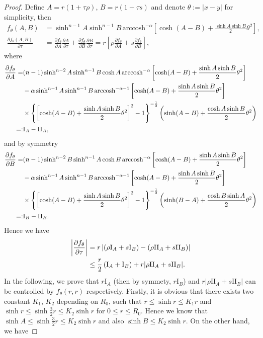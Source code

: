 \documentclass[11pt,reqno]{amsart}
\theoremstyle{definition}
\theoremstyle{remark}
\numberwithin{equation}{section}
\renewcommand{\(}{\left(}
\renewcommand{\)}{\right)}
\renewcommand{\-}{\overline}
\begin{document}
\begin{proof}
	Define $A=r(1+\tau\rho)$, $B=r(1+\tau s)$ and denote $\theta:=|x-y|$ for simplicity, then
	\begin{align}
		f_{\theta}(A,B)&=\sinh^{n-1}A\sinh^{n-1}B\,\text{arccosh}^{-\alpha}\left[\cosh(A-B)+\frac{\sinh A\sinh B}{2}\theta^2\right],\\
		\frac{\partial f_{\theta}(A,B)}{\partial\tau}&=\frac{\partial f_\theta}{\partial A}\frac{\partial A}{\partial\tau}+\frac{\partial f_\theta}{\partial B}\frac{\partial B}{\partial\tau}=r\left[\rho\frac{\partial f_\theta}{\partial A}+s\frac{\partial f_\theta}{\partial B}\right],
	\end{align}
	where 
	\begin{align}
		\frac{\partial f_{\theta}}{\partial A}=&(n-1)\sinh^{n-2}A\sinh^{n-1}B\cosh A\,\text{arccosh}^{-\alpha}\left[\cosh(A-B)+\frac{\sinh A\sinh B}{2}\theta^2\right]\notag\\
		&-\alpha\sinh^{n-1}A\sinh^{n-1}B\,\text{arccosh}^{-\alpha-1}\left[\cosh(A-B)+\frac{\sinh A\sinh B}{2}\theta^2\right]\notag\\
		&\times\left\{\left[\cosh(A-B)+\frac{\sinh A\sinh B}{2}\theta^2\right]^2-1\right\}^{-\frac{1}{2}}\left(\sinh(A-B)+\frac{\cosh A\sinh B}{2}\theta^2\right)\notag\\
		=:&\text{I}_A-\text{II}_A,
	\end{align}
	and by symmetry
	\begin{align}
		\frac{\partial f_{\theta}}{\partial B}=&(n-1)\sinh^{n-2}B\sinh^{n-1}A\cosh B\,\text{arccosh}^{-\alpha}\left[\cosh(A-B)+\frac{\sinh A\sinh B}{2}\theta^2\right]\notag\\
		&-\alpha\sinh^{n-1}A\sinh^{n-1}B\,\text{arccosh}^{-\alpha-1}\left[\cosh(A-B)+\frac{\sinh A\sinh B}{2}\theta^2\right]\notag\\
		&\times\left\{\left[\cosh(A-B)+\frac{\sinh A\sinh B}{2}\theta^2\right]^2-1\right\}^{-\frac{1}{2}}\left(\sinh(B-A)+\frac{\cosh B\sinh A}{2}\theta^2\right)\notag\\
		=:&\text{I}_B-\text{II}_B.
	\end{align}
	Hence we have
	\begin{align}
		\left|\frac{\partial f_{\theta}}{\partial\tau}\right|&=r\left|(\rho\text{I}_A+s\text{I}_B)-(\rho\text{II}_A+s\text{II}_B)\right|\notag\\
		&\leq\frac{r}{2}\left(\text{I}_A+\text{I}_B\right)+r|\rho\text{II}_A+s\text{II}_B|.\label{Eq-App1}
	\end{align}
In the following, we prove that $r\text{I}_A$ (then by symmety, $r\text{I}_B$) and $r|\rho\text{II}_A+s\text{II}_B|$ can be controlled by $f_{\theta}(r,r)$ respectively. Firstly, it is obvious that there exists two constant $K_1$, $K_2$ depending on $R_0$, such that $r\leq\sinh r\leq K_1 r$ and $\sinh r\leq \sinh \frac{3}{2}r\leq K_2\sinh r$ for $0\leq r\leq R_0$. Hence we know that $\sinh A\leq \sinh\frac{3}{2}r\leq K_2\sinh r$ and also $\sinh B\leq K_2\sinh r$. On the other hand, we have

\end{proof}
\end{document}
